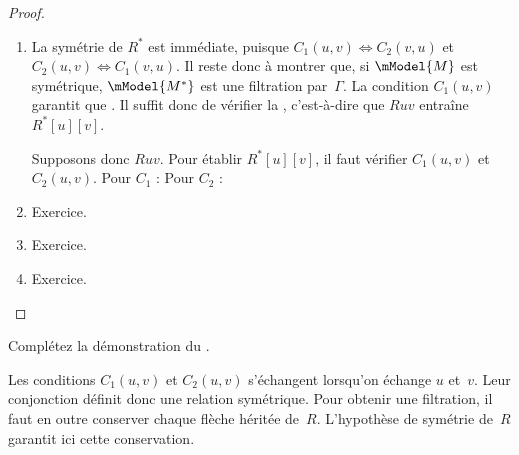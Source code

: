 \documentclass[../../../include/open-logic-section]{subfiles}
\begin{document}
\begin{proof}
  \begin{enumerate}
    \item La symétrie de $R^*$ est immédiate, puisque $C_1(u,v)
      \Leftrightarrow C_2(v,u)$ et $C_2(u,v) \Leftrightarrow
      C_1(v,u)$. Il reste donc à montrer que, si $\mModel{M}$ est
      symétrique, $\mModel{M^*}$ est une filtration par~$\Gamma$.
      La condition $C_1(u,v)$ garantit que
      .
      Il suffit donc de vérifier la
      ,
      c'est-à-dire que $Ruv$ entraîne $R^*[u][v]$.

      Supposons donc $Ruv$. Pour établir $R^*[u][v]$, il faut
      vérifier $C_1(u,v)$ et $C_2(u,v)$. Pour $C_1$ :
       Pour $C_2$ : 
    \item Exercice.
    \item Exercice.
    \item Exercice.
  \end{enumerate}
\end{proof}

\begin{prob}
  Complétez la démonstration du .
\end{prob}
\begin{explain}
Les conditions $C_1(u,v)$ et $C_2(u,v)$ s'échangent
lorsqu'on échange $u$ et~$v$. Leur conjonction définit donc
une relation symétrique. Pour obtenir une filtration, il
faut en outre conserver chaque flèche héritée de~$R$.
L'hypothèse de symétrie de~$R$ garantit ici cette conservation.
\end{explain}
\end{document}
